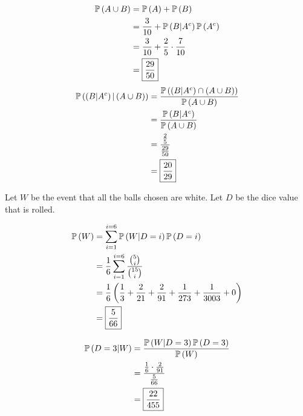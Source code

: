 \documentclass{article}
\begin{document}
\begin{align*}
  \mathbb{P} \left ( A \cup B \right) &= \mathbb{P} \left ( A \right) + \mathbb{P} \left ( B \right) \\
                &= \frac{3}{10} + \mathbb{P} \left ( B \vert A^c \right) \mathbb{P} \left ( A^c \right) \\
                &= \frac{3}{10} + \frac{2}{5} \cdot \frac{7}{10} \\
                &= \boxed{\frac{29}{50}} \\
\end{align*}
\subproblema{}
\begin{align*}
  \mathbb{P} \left ( \left (B \vert A^c \right) \vert \left (A \cup B \right) \right) &= \frac{\mathbb{P} \left ( \left (B \vert A^c \right) \cap \left (A \cup B \right) \right)}{\mathbb{P} \left ( A \cup B \right)} \\
                                                &= \frac{\mathbb{P} \left ( B \vert A^c \right)}{\mathbb{P} \left ( A \cup B \right)} \\
                                                &= \frac{\frac{2}{5}}{\frac{29}{50}} \\
                                                &= \boxed{\frac{20}{29}} \\
\end{align*}


\setcounter{problem}{48}
\problem{}
Let $W$ be the event that all the balls chosen are white.
Let $D$ be the dice value that is rolled.

\begin{align*}
  \mathbb{P} \left ( W \right) &= \sum \limits_{i = 1}^{i=6} \mathbb{P} \left ( W \vert D = i \right) \mathbb{P} \left ( D = i \right) \\
         &= \frac{1}{6} \sum \limits_{i=1}^{i=6} \frac{\binom{5}{i}}{\binom{15}{i}} \\
         &= \frac{1}{6} \left (\frac{1}{3} + \frac{2}{21} + \frac{2}{91} + \frac{1}{273} + \frac{1}{3003} + 0 \right) \\
         &= \boxed{\frac{5}{66}} \\
\end{align*}

\begin{align*}
  \mathbb{P} \left ( D = 3 \vert W \right) &= \frac{\mathbb{P} \left ( W \vert D = 3 \right) \mathbb{P} \left ( D = 3 \right)}{\mathbb{P} \left ( W \right)} \\
                     &= \frac{\frac{1}{6} \cdot \frac{2}{91}}{\frac{5}{66}} \\
                     &= \boxed{\frac{22}{455}} \\
\end{align*}
\end{document}
